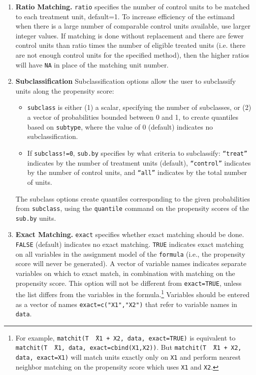 \documentclass[oneside,letterpaper,titlepage]{article}
\begin{document}
\begin{enumerate}
\item \textbf{Ratio Matching.}  \texttt{ratio} specifies the number of
  control units to be matched to each treatment unit, default=1.  To
  increase efficiency of the estimand when there is a large number of
  comparable control units available, use larger integer values. If
  matching is done without replacement and there are fewer control
  units than ratio times the number of eligible treated units (i.e.
  there are not enough control units for the specified method), then
  the higher ratios will have \texttt{NA} in place of the matching
  unit number.

\item \textbf{Subclassification}
  Subclassification options allow the user to subclassify units along
  the propensity score:
  \begin{itemize}
  \item \texttt{subclass} is either (1) a scalar, specifying the
    number of subclasses, or (2) a vector of probabilities bounded
    between 0 and 1, to create quantiles based on \texttt{subtype},
    where the value of 0 (default) indicates no subclassification.
  \item If \texttt{subclass!=0}, \texttt{sub.by} specifies by what
    criteria to subclassify: \texttt{``treat''} indicates by the
    number of treatment units (default), \texttt{``control''}
    indicates by the number of control units, and \texttt{``all''}
    indicates by the total number of units.
  \end{itemize}
  The subclass options create quantiles corresponding to the given
  probabilities from \texttt{subclass}, using the \texttt{quantile}
  command on the propensity scores of the \texttt{sub.by} units.
  
\item \textbf{Exact Matching.}  \texttt{exact} specifies whether exact
  matching should be done.  \texttt{FALSE} (default) indicates no
  exact matching.  \texttt{TRUE} indicates exact matching on all
  variables in the assignment model of the \texttt{formula} (i.e., the
  propensity score will never be generated).  A vector of variable
  names indicates separate variables on which to exact match, in
  combination with matching on the propensity score.  This option will
  not be different from \texttt{exact=TRUE}, unless the list differs
  from the variables in the formula.\footnote{For example,
    \texttt{matchit(T \~\ X1 + X2, data, exact=TRUE)} is equivalent to
    \texttt{matchit(T \~\ X1, data, exact=cbind(X1,X2))}.  But
    \texttt{matchit(T \~\ X1 + X2, data, exact=X1)} will match units
    exactly only on \texttt{X1} and perform nearest neighbor matching
    on the propensity score which uses \texttt{X1} and \texttt{X2}.}
  Variables should be entered as a vector of names
  \texttt{exact=c("X1","X2")} that refer to variable names in
  \texttt{data}.
  

\end{enumerate}
\end{document}

